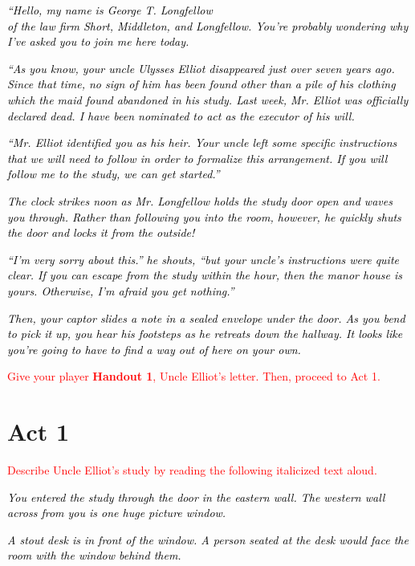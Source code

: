 \documentclass[a6paper, parskip=half, DIV=14, 12pt]{scrartcl}
\begin{document}
\textcolor{black}{\textit{``Hello, my name is George T. Longfellow\\of the law firm Short, Middleton, and Longfellow. You're probably wondering why I've asked you to join me here today.}}

\textcolor{black}{\textit{``As you know, your uncle Ulysses Elliot disappeared just over seven years ago. Since that time, no sign of him has been found other than a pile of his clothing which the maid found abandoned in his study. Last week, Mr. Elliot was officially declared dead. I have been nominated to act as the executor of his will.}}

\textcolor{black}{\textit{``Mr. Elliot identified you as his heir. Your uncle left some specific instructions that we will need to follow in order to formalize this arrangement. If you will follow me to the study, we can get started.''}}

\newpage

\textcolor{black}{\textit{The clock strikes noon as Mr. Longfellow holds the study door open and waves you through. Rather than following you into the room, however, he quickly shuts the door and locks it from the outside!}}

\textcolor{black}{\textit{``I'm very sorry about this.'' he shouts, ``but your uncle's instructions were quite clear. If you can escape from the study within the hour, then the manor house is yours. Otherwise, I'm afraid you get nothing.''}}

\textcolor{black}{\textit{Then, your captor slides a note in a sealed envelope under the door. As you bend to pick it up, you hear his footsteps as he retreats down the hallway. It looks like you're going to have to find a way out of here on your own.}}

\textcolor{Red}{Give your player \textbf{Handout 1}, Uncle Elliot's letter. Then, proceed to Act 1.}

\newpage

\section*{Act 1}
\textcolor{Red}{Describe Uncle Elliot's study by reading the following italicized text aloud.}

\textcolor{black}{\textit{You entered the study through the door in the eastern wall. The western wall across from you is one huge picture window.}}

\textcolor{black}{\textit{A stout desk is in front of the window. A person seated at the desk would face the room with the window behind them.}}
\end{document}
